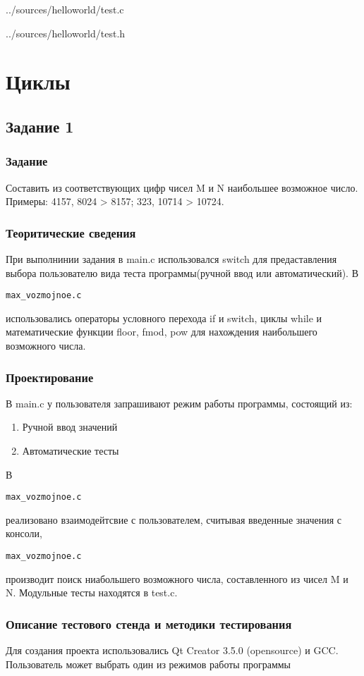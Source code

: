 \documentclass[12pt,a4paper]{report}
\begin{document}

{../sources/helloworld/test.c}


{../sources/helloworld/test.h}

\chapter{Циклы}
\section{Задание 1}
\subsection{Задание}
Составить из соответствующих цифр чисел M и N наибольшее возможное число.
Примеры: 4157, 8024 > 8157; 323, 10714 > 10724.
\subsection{Теоритические сведения}
При выполнинии задания в main.c использовался switch для предаставления выбора пользователю вида теста программы(ручной ввод или автоматический). В \begin{verbatim}max_vozmojnoe.c \end{verbatim} использовались операторы условного перехода if и switch, циклы while и математические функции floor, fmod, pow  для нахождения наибольшего возможного числа.
\subsection{Проектирование}
В main.c у пользователя запрашивают режим работы программы, состоящий из:
\begin{enumerate}
\item Ручной ввод значений
\item Автоматические тесты
\end{enumerate}

В \begin{verbatim}max_vozmojnoe.c \end{verbatim}  реализовано взаимодейтсвие с пользователем, считывая введенные значения с консоли, \begin{verbatim}max_vozmojnoe.c \end{verbatim}  производит поиск ниабольшего возможного числа, составленного из чисел M и N.
Модульные тесты находятся в test.c.
\subsection{Описание тестового стенда и методики тестирования}
Для создания проекта использовались Qt Creator 3.5.0 (opensource) и GCC.
Пользователь может выбрать один из режимов работы программы
\end{document}
